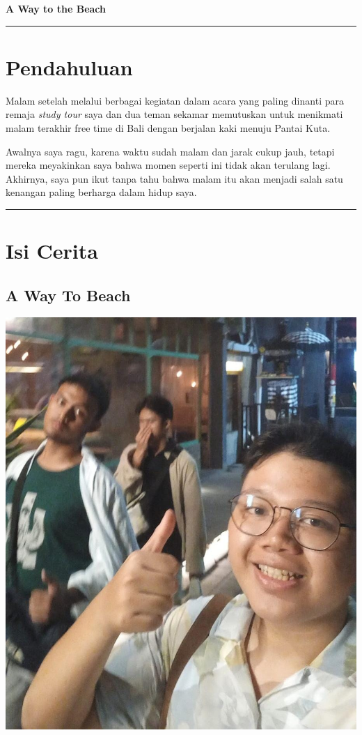 \documentclass[
  letterpaper,
  DIV=11,
  numbers=noendperiod]{scrreprt}
\begin{document}
\textbf{A Way to the Beach}

\begin{center}\rule{0.5\linewidth}{0.5pt}\end{center}

\section{Pendahuluan}\label{pendahuluan}

Malam setelah melalui berbagai kegiatan dalam acara yang paling dinanti
para remaja \emph{study tour} saya dan dua teman sekamar memutuskan
untuk menikmati malam terakhir free time di Bali dengan berjalan kaki
menuju Pantai Kuta.

Awalnya saya ragu, karena waktu sudah malam dan jarak cukup jauh, tetapi
mereka meyakinkan saya bahwa momen seperti ini tidak akan terulang
lagi.\\
Akhirnya, saya pun ikut tanpa tahu bahwa malam itu akan menjadi salah
satu kenangan paling berharga dalam hidup saya.

\begin{center}\rule{0.5\linewidth}{0.5pt}\end{center}

\section{Isi Cerita}\label{isi-cerita}

\subsection*{A Way To Beach}\label{a-way-to-beach}

\begin{center}
\includegraphics[width=0.6\linewidth,height=\textheight,keepaspectratio]{My_Stories_for_You/../images/myFriends.jpg}
\end{center}
\end{document}
